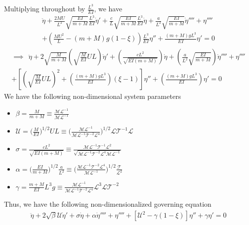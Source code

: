 \documentclass[12pt]{report}
\begin{document}
Multiplying throughout by $\frac{L^3}{EI}$, we have
\begin{multline*}
 \ddot{\eta} + \frac{2MU}{L^2}\sqrt{\frac{EI}{m + M}}\frac{L^3}{EI} \dot{\eta}' + \frac{c}{L}\sqrt{\frac{EI}{m + M}}\frac{L^3}{EI}\dot{\eta}  +  \frac{a}{L^2}\sqrt{\frac{EI}{m + M}} \dot{\eta}'''' + \eta''''  \\
 + \left(\frac{MU^2}{L} - (m + M)g(1 - \xi)\right)\frac{L^3}{EI}\eta''  + \frac{(m + M)gL^3}{EI}\eta'  = 0
\end{multline*}
\begin{multline*}
\implies ~~ \ddot{\eta} + 2\sqrt{\frac{M}{m+ M}}\left(\sqrt{\frac{M}{EI}}UL\right) \dot{\eta}' + \left(\frac{cL^2}{\sqrt{EI (m + M)}}\right)\dot{\eta}  +  \left(\frac{a}{L^2}\sqrt{\frac{EI}{m + M}}\right) \dot{\eta}'''' + \eta''''  \\
+ \left[\left(\sqrt{\frac{M}{EI}}UL\right)^2 + \left(\frac{(m + M)gL^3}{EI}\right)(\xi - 1)\right]\eta''  + \left(\frac{(m + M)gL^3}{EI}\right)\eta'  = 0
\end{multline*}
We have the following non-dimensional system parameters
\begin{itemize} 
	\item $\beta = \frac{M}{m + M} \equiv \frac{\mathcal{M}\mathcal{L}^{-1}}{\mathcal{M}\mathcal{L}^{-1}}$
	\item $\mathcal{U} = \bigg(\frac{M}{EI}\bigg)^{1/2}UL \equiv \big(\frac{\mathcal{M}\mathcal{L}^{-1}}{\mathcal{M}\mathcal{L}^{-1}\mathcal{T}^{-2}\mathcal{L}^4}\big)^{1/2} \mathcal{L}\mathcal{T}^{-1}\mathcal{L}$
	\item $\sigma = \frac{cL^2}{\sqrt{EI (m + M)}} \equiv \frac{\mathcal{M}\mathcal{L}^{-1}\mathcal{T}^{-1}\mathcal{L}^{2}}{\sqrt{\mathcal{M}\mathcal{L}^{-1}\mathcal{T}^{-2}\mathcal{L}^4 \mathcal{M}\mathcal{L}^{-1}}}$
	
	\item $\alpha = \bigg(\frac{EI}{m + M}\bigg)^{1/2}\frac{a}{L^2} \equiv \bigg(\frac{\mathcal{M}\mathcal{L}^{-1}\mathcal{T}^{-2}\mathcal{L}^4}{\mathcal{M}\mathcal{L}^{-1}}\bigg)^{1/2}\frac{\mathcal{T}}{\mathcal{L}^2}$ 
	
	\item $\gamma = \frac{m + M}{EI}L^3g \equiv \frac{\mathcal{M}\mathcal{L}^{-1}}{\mathcal{M}\mathcal{L}^{-1}\mathcal{T}^{-2}\mathcal{L}^4}\mathcal{L}^3\mathcal{L}\mathcal{T}^{-2}$
\end{itemize}

\begin{mdframed}
 Thus, we have the following non-dimensionalized governing equation 
 \begin{align}
 \ddot{\eta} + 2\sqrt{\beta}\mathcal{U}\dot{\eta}' + \sigma\dot{\eta}  +  \alpha \dot{\eta}'''' + \eta'''' + \left[\mathcal{U}^2 - \gamma (1 - \xi)\right]\eta''  + \gamma\eta'  = 0 \label{eqn:non-dimensional-linear-cantilevered-pipe-dissipation}
 \end{align}
\end{mdframed}
\end{document}
